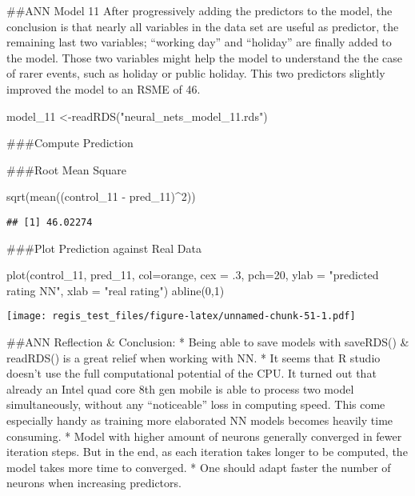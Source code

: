 \documentclass[
]{article}
\newenvironment{Shaded}{\begin{snugshade}}{\end{snugshade}}
\newcommand{\AttributeTok}[1]{\textcolor[rgb]{0.77,0.63,0.00}{#1}}
\newcommand{\DecValTok}[1]{\textcolor[rgb]{0.00,0.00,0.81}{#1}}
\newcommand{\FunctionTok}[1]{\textcolor[rgb]{0.00,0.00,0.00}{#1}}
\newcommand{\NormalTok}[1]{#1}
\newcommand{\OtherTok}[1]{\textcolor[rgb]{0.56,0.35,0.01}{#1}}
\newcommand{\SpecialCharTok}[1]{\textcolor[rgb]{0.00,0.00,0.00}{#1}}
\newcommand{\StringTok}[1]{\textcolor[rgb]{0.31,0.60,0.02}{#1}}
\begin{document}
\#\#ANN Model 11 After progressively adding the predictors to the model,
the conclusion is that nearly all variables in the data set are useful
as predictor, the remaining last two variables; ``working day'' and
``holiday'' are finally added to the model. Those two variables might
help the model to understand the the case of rarer events, such as
holiday or public holiday. This two predictors slightly improved the
model to an RSME of 46.

\begin{Shaded}
\begin{Highlighting}[]
\NormalTok{model\_11 }\OtherTok{\textless{}{-}}\FunctionTok{readRDS}\NormalTok{(}\StringTok{"neural\_nets\_model\_11.rds"}\NormalTok{)}
\end{Highlighting}
\end{Shaded}

\#\#\#Compute Prediction

\#\#\#Root Mean Square

\begin{Shaded}
\begin{Highlighting}[]
\FunctionTok{sqrt}\NormalTok{(}\FunctionTok{mean}\NormalTok{((control\_11 }\SpecialCharTok{{-}}\NormalTok{ pred\_11)}\SpecialCharTok{\^{}}\DecValTok{2}\NormalTok{))}
\end{Highlighting}
\end{Shaded}

\begin{verbatim}
## [1] 46.02274
\end{verbatim}

\#\#\#Plot Prediction against Real Data

\begin{Shaded}
\begin{Highlighting}[]
\FunctionTok{plot}\NormalTok{(control\_11, pred\_11, }\AttributeTok{col=}\StringTok{\textquotesingle{}orange\textquotesingle{}}\NormalTok{, }\AttributeTok{cex =}\NormalTok{ .}\DecValTok{3}\NormalTok{, }\AttributeTok{pch=}\DecValTok{20}\NormalTok{, }\AttributeTok{ylab =} \StringTok{"predicted rating NN"}\NormalTok{, }\AttributeTok{xlab =} \StringTok{"real rating"}\NormalTok{)}
\FunctionTok{abline}\NormalTok{(}\DecValTok{0}\NormalTok{,}\DecValTok{1}\NormalTok{)}
\end{Highlighting}
\end{Shaded}

\texttt{[image: regis\_test\_files/figure-latex/unnamed-chunk-51-1.pdf]}

\#\#ANN Reflection \& Conclusion: * Being able to save models with
saveRDS() \& readRDS() is a great relief when working with NN. * It
seems that R studio doesn't use the full computational potential of the
CPU. It turned out that already an Intel quad core 8th gen mobile is
able to process two model simultaneously, without any ``noticeable''
loss in computing speed. This come especially handy as training more
elaborated NN models becomes heavily time consuming. * Model with higher
amount of neurons generally converged in fewer iteration steps. But in
the end, as each iteration takes longer to be computed, the model takes
more time to converged. * One should adapt faster the number of neurons
when increasing predictors.
\end{document}
